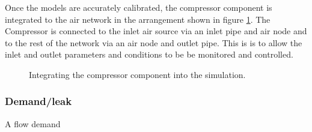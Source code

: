 		\par
		Once the models are accurately calibrated, the compressor component is integrated to the air network in the arrangement shown in figure \ref{fig: Compressor models}. The Compressor is connected to the inlet air source via an inlet pipe and air node and to the rest of the network via an air node and outlet pipe. This is is to allow the inlet and outlet parameters and conditions to be be monitored and controlled.
		\begin{figure}[h]
			\centering
			\caption{Integrating the compressor component into the simulation.}
			\label{fig: Compressor models}
		\end{figure}		

		\subsubsection{Demand/leak}
			A flow demand 
